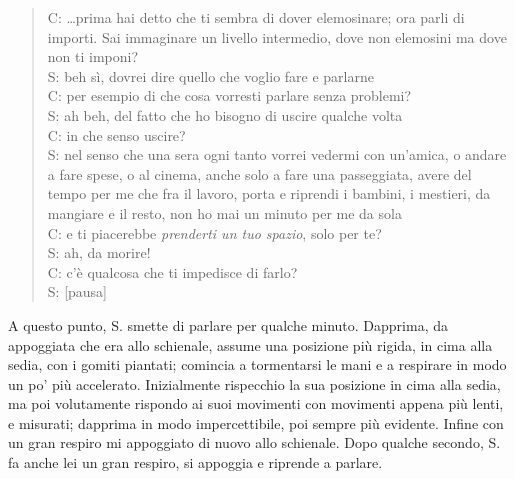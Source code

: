\begin{verse}
C: \ldots{}prima hai detto che ti sembra di dover elemosinare; ora parli di importi. Sai immaginare un livello intermedio, dove non elemosini ma dove non ti imponi?\\
S: beh sì, dovrei dire quello che voglio fare e parlarne\\
C: per esempio di che cosa vorresti parlare senza problemi?\\
S: ah beh, del fatto che ho bisogno di uscire qualche volta\\
C: in che senso uscire?\\
S: nel senso che una sera ogni tanto vorrei vedermi con un'amica, o andare a fare spese, o al cinema, anche solo a fare una passeggiata, avere del tempo per me che  fra il lavoro, porta e riprendi i bambini, i mestieri, da mangiare e il resto, non ho mai un minuto per me da sola\\
C: e ti piacerebbe \emph{prenderti un tuo spazio}, solo per te?\\
S: ah, da morire!\\
C: c'è qualcosa che ti impedisce di farlo?\\
S: [pausa]
\end{verse}

\noindent A questo punto,  S. smette di parlare per qualche minuto. Dapprima, da appoggiata che era allo schienale, assume una posizione più rigida, in cima alla sedia, con i gomiti piantati; comincia a tormentarsi le mani e a respirare in modo un po' più accelerato. Inizialmente rispecchio la sua posizione in cima alla sedia, ma poi volutamente rispondo ai suoi movimenti con movimenti appena più lenti, e misurati; dapprima in modo impercettibile, poi sempre più evidente. Infine con un gran respiro mi appoggiato di nuovo allo schienale. Dopo qualche secondo, S. fa anche lei un gran respiro, si appoggia e riprende a parlare.

